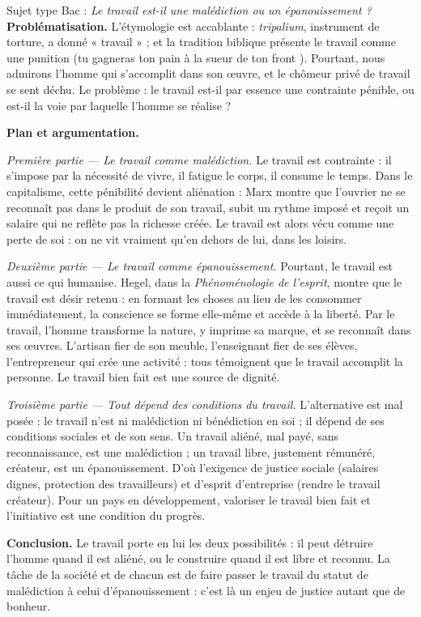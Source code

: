 \documentclass[11pt]{article}
\newcommand{\cle}[1]{{\popxbold\color{popdark}#1}}
\begin{document}
\begin{exoresolu}
Sujet type Bac : \emph{Le travail est-il une malédiction ou un épanouissement ?}
\tcblower
\textbf{Problématisation.} L'étymologie est accablante : \emph{tripalium}, instrument de torture, a donné « travail » ; et la tradition biblique présente le travail comme une punition (\guillemotleft tu gagneras ton pain à la sueur de ton front \guillemotright). Pourtant, nous admirons l'homme qui s'accomplit dans son œuvre, et le chômeur privé de travail se sent déchu. Le problème : le travail est-il par essence une contrainte pénible, ou est-il la voie par laquelle l'homme se réalise ?

\textbf{Plan et argumentation.}

\emph{Première partie — Le travail comme malédiction.} Le travail est contrainte : il s'impose par la nécessité de vivre, il fatigue le corps, il consume le temps. Dans le capitalisme, cette pénibilité devient \cle{aliénation} : Marx montre que l'ouvrier ne se reconnaît pas dans le produit de son travail, subit un rythme imposé et reçoit un salaire qui ne reflète pas la richesse créée. Le travail est alors vécu comme une perte de soi : on ne vit vraiment qu'en dehors de lui, dans les loisirs.

\emph{Deuxième partie — Le travail comme épanouissement.} Pourtant, le travail est aussi ce qui humanise. Hegel, dans la \emph{Phénoménologie de l'esprit}, montre que le travail est \guillemotleft désir retenu \guillemotright : en formant les choses au lieu de les consommer immédiatement, la conscience se forme elle-même et accède à la liberté. Par le travail, l'homme transforme la nature, y imprime sa marque, et se reconnaît dans ses œuvres. L'artisan fier de son meuble, l'enseignant fier de ses élèves, l'entrepreneur qui crée une activité : tous témoignent que le travail accomplit la personne. Le travail bien fait est une source de dignité.

\emph{Troisième partie — Tout dépend des conditions du travail.} L'alternative est mal posée : le travail n'est ni malédiction ni bénédiction en soi ; il dépend de ses conditions sociales et de son sens. Un travail aliéné, mal payé, sans reconnaissance, est une malédiction ; un travail libre, justement rémunéré, créateur, est un épanouissement. D'où l'exigence de justice sociale (salaires dignes, protection des travailleurs) et d'esprit d'entreprise (rendre le travail créateur). Pour un pays en développement, valoriser le travail bien fait et l'initiative est une condition du progrès.

\textbf{Conclusion.} Le travail porte en lui les deux possibilités : il peut détruire l'homme quand il est aliéné, ou le construire quand il est libre et reconnu. La tâche de la société et de chacun est de faire passer le travail du statut de malédiction à celui d'épanouissement : c'est là un enjeu de justice autant que de bonheur.
\end{exoresolu}
\end{document}
